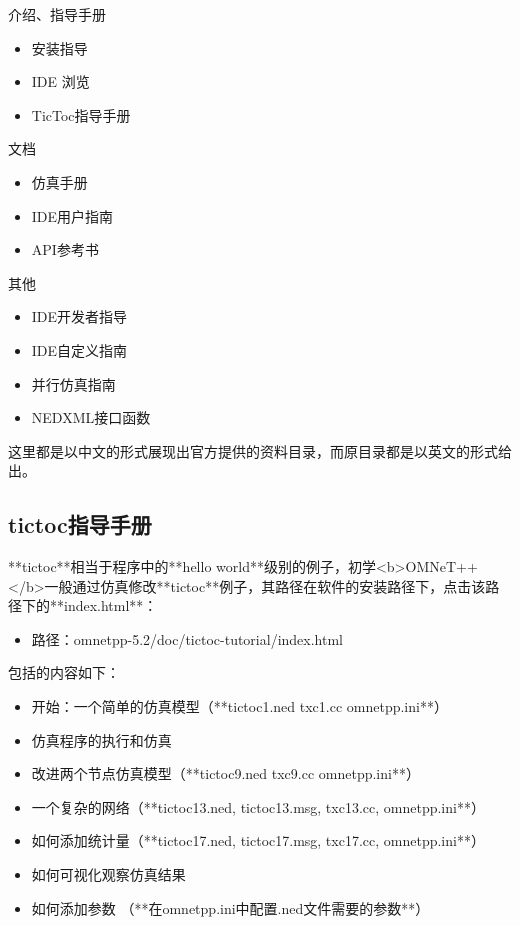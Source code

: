 介绍、指导手册
\begin{itemize}
\item 安装指导
\item IDE 浏览
\item TicToc指导手册
\end{itemize}

文档
\begin{itemize}
	\item 仿真手册
	\item IDE用户指南
	\item API参考书
\end{itemize}

其他
\begin{itemize}
	\item IDE开发者指导
	\item IDE自定义指南
	\item 并行仿真指南
	\item NEDXML接口函数 
\end{itemize}

这里都是以中文的形式展现出官方提供的资料目录，而原目录都是以英文的形式给出。\\

\subsection{tictoc指导手册}
**tictoc**相当于程序中的**hello world**级别的例子，初学<b>OMNeT++</b>一般通过仿真修改**tictoc**例子，其路径在软件的安装路径下，点击该路径下的**index.html**：

\begin{itemize}
	\item 路径：omnetpp-5.2/doc/tictoc-tutorial/index.html 
\end{itemize}

包括的内容如下：
\begin{itemize}
	\item 开始：一个简单的仿真模型（**tictoc1.ned txc1.cc omnetpp.ini**）
	\item 仿真程序的执行和仿真
	\item 改进两个节点仿真模型（**tictoc9.ned txc9.cc omnetpp.ini**）
	\item 一个复杂的网络（**tictoc13.ned, tictoc13.msg, txc13.cc, omnetpp.ini**）
	\item 如何添加统计量（**tictoc17.ned, tictoc17.msg, txc17.cc, omnetpp.ini**）
	\item 如何可视化观察仿真结果
	\item 如何添加参数 （**在omnetpp.ini中配置.ned文件需要的参数**）\\
\end{itemize}

